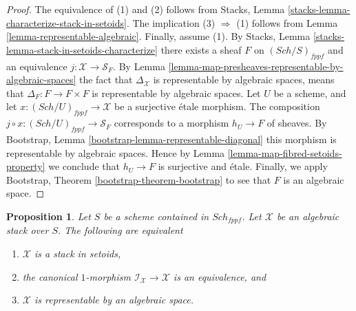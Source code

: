 \documentclass{stacks-project}
\theoremstyle{plain}
\newtheorem{proposition}[subsection]{Proposition}
\theoremstyle{definition}
\theoremstyle{remark}
\numberwithin{equation}{subsection}
\def\Sch{\mathit{Sch}}
\begin{document}
\begin{proof}
The equivalence of (1) and (2) follows from
Stacks, Lemma \ref{stacks-lemma-characterize-stack-in-setoids}.
The implication (3) $\Rightarrow$ (1) follows from
Lemma \ref{lemma-representable-algebraic}.
Finally, assume (1). By
Stacks, Lemma \ref{stacks-lemma-stack-in-setoids-characterize}
there exists a sheaf $F$ on $(\Sch/S)_{fppf}$
and an equivalence $j : \mathcal{X} \to \mathcal{S}_F$. By
Lemma \ref{lemma-map-presheaves-representable-by-algebraic-spaces}
the fact that $\Delta_\mathcal{X}$ is representable by algebraic
spaces, means that $\Delta_F : F \to F \times F$
is representable by algebraic spaces.
Let $U$ be a scheme, and let $x : (\Sch/U)_{fppf} \to \mathcal{X}$
be a surjective \'etale morphism. The composition
$j \circ x : (\Sch/U)_{fppf} \to \mathcal{S}_F$
corresponds to a morphism $h_U \to F$ of sheaves. By
Bootstrap, Lemma \ref{bootstrap-lemma-representable-diagonal}
this morphism is representable by algebraic spaces.
Hence by
Lemma \ref{lemma-map-fibred-setoids-property}
we conclude that $h_U \to F$ is surjective and \'etale.
Finally, we apply
Bootstrap, Theorem \ref{bootstrap-theorem-bootstrap}
to see that $F$ is an algebraic space.
\end{proof}

\begin{proposition}
\label{proposition-algebraic-stack-no-automorphisms}
Let $S$ be a scheme contained in $\Sch_{fppf}$.
Let $\mathcal{X}$ be an algebraic stack over $S$.
The following are equivalent
\begin{enumerate}
\item $\mathcal{X}$ is a stack in setoids,
\item the canonical $1$-morphism $\mathcal{I}_\mathcal{X} \to \mathcal{X}$
is an equivalence, and
\item $\mathcal{X}$ is representable by an algebraic space.
\end{enumerate}
\end{proposition}
\end{document}
